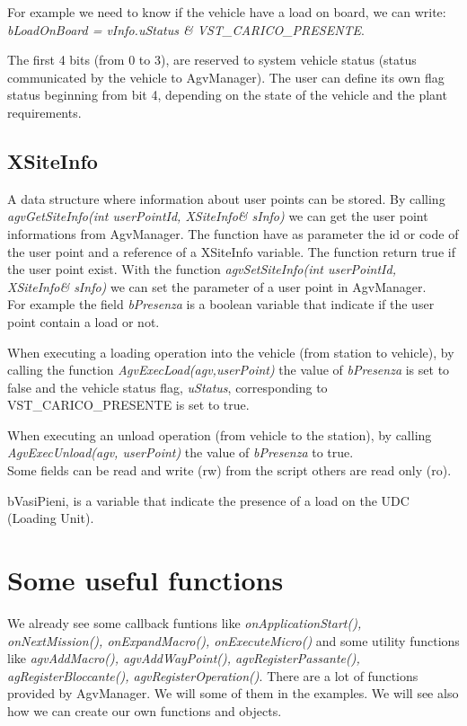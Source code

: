 For example we need to know if the vehicle have a load on board, we can write:
\textit{bLoadOnBoard = vInfo.uStatus  \&  VST\_CARICO\_PRESENTE}.

The first 4 bits (from 0 to 3), are reserved to system vehicle status (status communicated by the vehicle to AgvManager).
The user can define its own flag status beginning from bit 4, depending on the state of the vehicle and the plant requirements.\\

\subsection{XSiteInfo}
A data structure where information about user points can be stored.
By calling \textit{agvGetSiteInfo(int userPointId, XSiteInfo\& sInfo)} we can get the user point informations from AgvManager. The function have as parameter the id or code of the user point and a reference of a XSiteInfo variable.
The function return true if the user point exist.
With the function \textit{agvSetSiteInfo(int userPointId, XSiteInfo\& sInfo)} we can set the parameter of a user point in AgvManager.\\

For example the field \textit{bPresenza} is a boolean variable that indicate if the user point contain a load or not.

When executing a loading operation into the vehicle (from station to vehicle), by calling the function \textit{AgvExecLoad(agv,userPoint)} the value of \textit{bPresenza} is set to false and the vehicle status flag, \textit{uStatus}, corresponding to VST\_CARICO\_PRESENTE is set to true.

When executing an unload operation (from vehicle to the station), by calling \textit{AgvExecUnload(agv, userPoint)} the value of \textit{bPresenza} to true.\\

Some fields can be read and write (rw) from the script others are read only (ro).

bVasiPieni, is a variable that indicate the presence of a load on the UDC (Loading Unit).

\section{Some useful functions}
We already see some callback funtions like \textit{onApplicationStart(), onNextMission(), onExpandMacro(), onExecuteMicro()} and some utility functions like \textit{agvAddMacro(), agvAddWayPoint(), agvRegisterPassante(), agRegisterBloccante(), agvRegisterOperation()}. There are a lot of functions provided by AgvManager. We will some of them in the examples. We will see also how we can create our own functions and objects.

